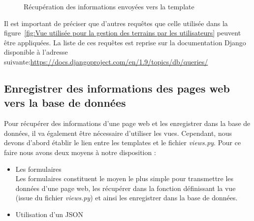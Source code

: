 \begin{figure}[!ht]
\centering
\begin{framed}

\end{framed}
\caption{Récupération des informations envoyées vers la template}
\label{fig:Récupération des informations envoyées vers la template}
\end{figure}
\FloatBarrier

Il est important de préciser que d'autres requêtes que celle utilisée dans la figure~\ref{fig:Vue utilisée pour la gestion des terrains par les utilisateurs} peuvent être appliquées. La liste de ces requêtes est reprise sur la documentation Django disponible à l'adresse suivante:\url{https://docs.djangoproject.com/en/1.9/topics/db/queries/}

\subsection{Enregistrer des informations des pages web vers la base de données}

Pour récupérer des informations d'une page web et les enregistrer dans la base de données, il va également être nécessaire d'utiliser les vues. Cependant, nous devons d'abord établir le lien entre les templates et le fichier \textit{views.py}. Pour ce faire nous avons deux moyens à notre disposition : \\

\begin{itemize}
\item Les formulaires\\

Les formulaires constituent le moyen le plus simple pour transmettre les données d'une page web, les récupérer dans la fonction définissant la vue (issue du fichier \textit{views.py}) et ainsi les enregistrer dans la base de données.\\

\item Utilisation d'un JSON\\

\end{itemize}
